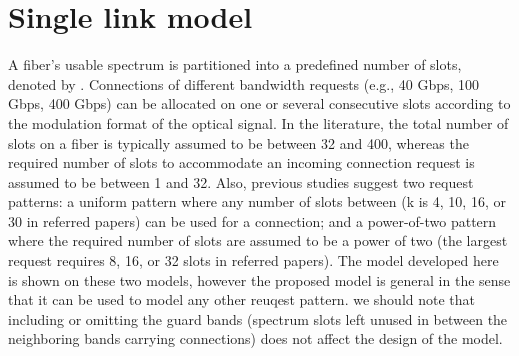 \documentclass[letterpaper,10pt]{article}\pdfoutput=1
\begin{document}
\section{Single link model}
A fiber's usable spectrum is partitioned into a predefined number of slots, denoted by . 
Connections of different bandwidth requests (e.g., 40 Gbps, 100 Gbps, 400 Gbps) can be allocated
on one or several consecutive slots according to the modulation format of the optical signal. 
In the literature, the total number of slots  on a fiber is typically assumed to be between 32 and 400, 
whereas the required number of slots to accommodate an incoming connection request is assumed to be
between 1 and 32. Also, previous studies suggest two request patterns:
a uniform pattern where any number of slots between  (k is 4, 10, 16, or 30 in referred papers) 
can be used\cite{chen,fun,chris} for a connection;
and a power-of-two pattern where the required number of slots are assumed to be a power of 
two\cite{almeida,castro} (the largest request requires 8, 16, or 32 slots in referred papers). 
The model developed here is shown on these two models,
however the proposed model is general in the sense that it can be used to model any other reuqest pattern. 
we should note that including or omitting the guard bands (spectrum slots left unused in between the neighboring 
bands carrying connections) does not affect the design of the model.
\end{document}
